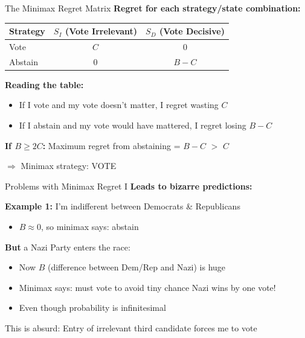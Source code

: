 \documentclass[10pt]{beamer}
\begin{document}
\begin{frame}{The Minimax Regret Matrix}
\textbf{Regret for each strategy/state combination:}


\begin{table}
\centering
\begin{tabular}{l|cc}
\toprule
\textbf{Strategy} & $S_I$ (Vote Irrelevant) & $S_D$ (Vote Decisive) \\
\midrule
Vote & $C$ & $0$ \\
Abstain & $0$ & $B - C$ \\
\bottomrule
\end{tabular}
\end{table}


\textbf{Reading the table:}
\begin{itemize}
\item If I vote and my vote doesn't matter, I regret wasting $C$
\item If I abstain and my vote would have mattered, I regret losing $B-C$
\end{itemize}


\textbf{If $B \geq 2C$:} Maximum regret from abstaining = $B - C$ $>$ $C$

$\Rightarrow$ Minimax strategy: \alert{VOTE}
\end{frame}

\begin{frame}{Problems with Minimax Regret I}
\textbf{Leads to bizarre predictions:}


\textbf{Example 1:} I'm indifferent between Democrats \& Republicans
\begin{itemize}
\item $B \approx 0$, so minimax says: abstain
\end{itemize}


\textbf{But} a Nazi Party enters the race:
\begin{itemize}
\item Now $B$ (difference between Dem/Rep and Nazi) is huge
\item Minimax says: must vote to avoid tiny chance Nazi wins by one vote!
\item Even though probability is infinitesimal
\end{itemize}


\alert{This is absurd:} Entry of irrelevant third candidate forces me to vote
\end{frame}
\end{document}
